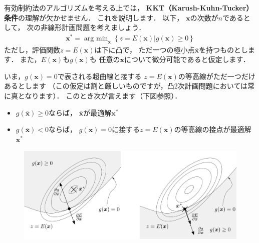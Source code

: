 ﻿\documentclass{jsarticle}
\begin{document}
有効制約法のアルゴリズムを考える上では，
{\bf KKT（Karush-Kuhn-Tucker）条件}の理解が欠かせません．
これを説明します．
以下，
$\boldsymbol{x}$の次数が$n$であるとして，
次の非線形計画問題を考えましょう．
\begin{align*}
\boldsymbol{x}^{*}=\mathop{\mathrm{arg~min}}_{\boldsymbol{x}}\left\{
\left.
z=E(\boldsymbol{x})
\right|
g(\boldsymbol{x})\geq 0
\right\}
\end{align*}
ただし，評価関数$z=E(\boldsymbol{x})$は下に凸で，
ただ一つの極小点$\bar{\boldsymbol{x}}$を持つものとします．
また，$E(\boldsymbol{x})$も$g(\boldsymbol{x})$も
任意の$\boldsymbol{x}$について微分可能であると仮定します．

いま，$g(\boldsymbol{x})=0$で表される超曲線と接する
$z=E(\boldsymbol{x})$の等高線がただ一つだけあるとします
（この仮定は割と厳しいものですが，凸2次計画問題においては常に真となります）．
このとき次が言えます（下図参照）．
\begin{itemize}
\item{
$g(\bar{\boldsymbol{x}})\geq 0$ならば，
$\bar{\boldsymbol{x}}$が最適解$\boldsymbol{x}^{*}$
}
\item{
$g(\bar{\boldsymbol{x}})<0$ならば，
$g(\boldsymbol{x})=0$に接する$z=E(\boldsymbol{x})$の等高線の接点が最適解$\boldsymbol{x}^{*}$
}
\end{itemize}

\begin{figure}[h]
\begin{center}
\includegraphics[width=.8\textwidth]{fig/Kuhn-Tucker.eps}
\end{center}
\end{figure}
\end{document}
